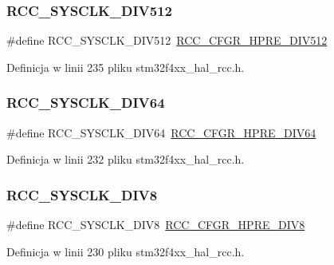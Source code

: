 \subsubsection{\texorpdfstring{R\+C\+C\+\_\+\+S\+Y\+S\+C\+L\+K\+\_\+\+D\+I\+V512}{RCC\_SYSCLK\_DIV512}}
{\footnotesize\ttfamily \#define R\+C\+C\+\_\+\+S\+Y\+S\+C\+L\+K\+\_\+\+D\+I\+V512~\hyperlink{group___peripheral___registers___bits___definition_gae5088dcbaefc55d4b6693e9b1e595ed0}{R\+C\+C\+\_\+\+C\+F\+G\+R\+\_\+\+H\+P\+R\+E\+\_\+\+D\+I\+V512}}



Definicja w linii 235 pliku stm32f4xx\+\_\+hal\+\_\+rcc.\+h.

\mbox{\label{group___r_c_c___a_h_b___clock___source_ga73814b5a7ee000687ec8334637ca5b14}} 
\subsubsection{\texorpdfstring{R\+C\+C\+\_\+\+S\+Y\+S\+C\+L\+K\+\_\+\+D\+I\+V64}{RCC\_SYSCLK\_DIV64}}
{\footnotesize\ttfamily \#define R\+C\+C\+\_\+\+S\+Y\+S\+C\+L\+K\+\_\+\+D\+I\+V64~\hyperlink{group___peripheral___registers___bits___definition_ga1caeba8dc2b4c0bb11be600e983e3370}{R\+C\+C\+\_\+\+C\+F\+G\+R\+\_\+\+H\+P\+R\+E\+\_\+\+D\+I\+V64}}



Definicja w linii 232 pliku stm32f4xx\+\_\+hal\+\_\+rcc.\+h.

\mbox{\label{group___r_c_c___a_h_b___clock___source_ga7def31373854ba9c72bb76b1d13e3aad}} 
\subsubsection{\texorpdfstring{R\+C\+C\+\_\+\+S\+Y\+S\+C\+L\+K\+\_\+\+D\+I\+V8}{RCC\_SYSCLK\_DIV8}}
{\footnotesize\ttfamily \#define R\+C\+C\+\_\+\+S\+Y\+S\+C\+L\+K\+\_\+\+D\+I\+V8~\hyperlink{group___peripheral___registers___bits___definition_gaca71d6b42bdb83b5ff5320578869a058}{R\+C\+C\+\_\+\+C\+F\+G\+R\+\_\+\+H\+P\+R\+E\+\_\+\+D\+I\+V8}}



Definicja w linii 230 pliku stm32f4xx\+\_\+hal\+\_\+rcc.\+h.

